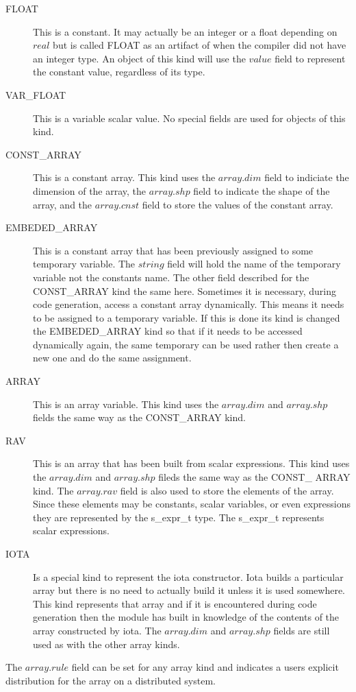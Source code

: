 \begin{description}
\item[FLOAT] This is a constant.  It may actually be an integer or a float
depending on $real$ but is called FLOAT as an artifact of when the compiler did
not have an integer type.  An object of this kind will use the $value$ field
to represent the constant value, regardless of its type.

\item[VAR\_FLOAT] This is a variable scalar value.  No special fields are used
for objects of this kind.

\item[CONST\_ARRAY] This is a constant array.  This kind uses the $array.dim$
field to indiciate the dimension of the array, the $array.shp$ field to 
indicate the shape of the array, and the $array.cnst$ field to store the
values of the constant array.

\item[EMBEDED\_ARRAY] This is a constant array that has been previously 
assigned to some temporary variable.  The $string$ field will hold the name
of the temporary variable not the constants name.  The other field described
for the CONST\_ARRAY kind the same here.  Sometimes it is necessary, during
code generation, access a constant array dynamically.  This means it needs
to be assigned to a temporary variable.  If this is done its kind is changed
the EMBEDED\_ARRAY kind so that if it needs to be accessed dynamically again,
the same temporary can be used rather then create a new one and do the same
assignment.

\item[ARRAY] This is an array variable.  This kind uses the $array.dim$ and
$array.shp$ fields the same way as the CONST\_ARRAY kind.

\item[RAV] This is an array that has been built from scalar expressions.  This 
kind uses the $array.dim$ and $array.shp$ fileds the same way as the CONST\_
ARRAY kind.
The $array.rav$ field is also used to store the elements of the array.  Since
these elements may be constants, scalar variables, or even expressions they
are represented by the s\_expr\_t type.  The s\_expr\_t represents scalar
expressions.

\item[IOTA] Is a special kind to represent the iota constructor.  Iota builds
a particular array but there is no need to actually build it unless it is
used somewhere.  This kind represents that array and if it is encountered 
during code generation then the module has built in knowledge of the contents
of the array constructed by iota.  The $array.dim$ and $array.shp$ fields are
still used as with the other array kinds.
\end{description}
The $array.rule$ field can be set for any array kind and indicates a users
explicit distribution for the array on a distributed system.

